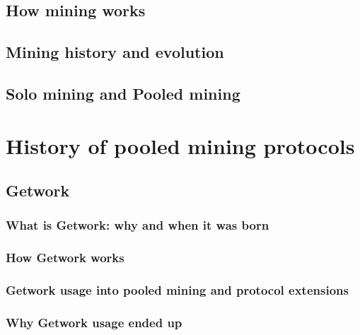 \documentclass[a4paper,12pt,twoside,english]{toptesi}
\begin{document}
\section{How mining works}

\newpage
\section{Mining history and evolution}

\newpage
\section{Solo mining and Pooled mining}\label{sec:pooled_mining}

%
%
\chapter{History of pooled mining protocols}
\section{Getwork}
\subsection{What is Getwork: why and when it was born}

\subsection{How Getwork works}

\subsection{Getwork usage into pooled mining and protocol extensions}

\subsection{Why Getwork usage ended up}

\newpage
\end{document}
